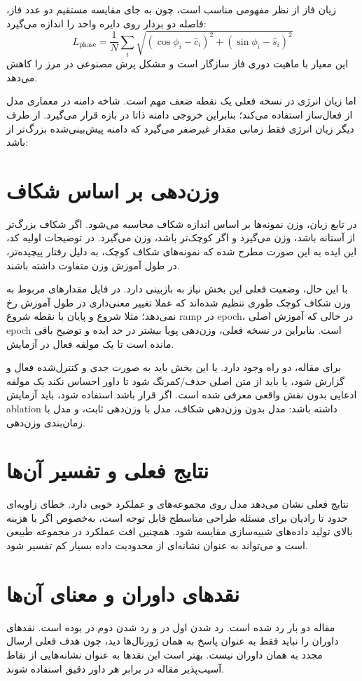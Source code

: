 زیان فاز از نظر مفهومی مناسب است، چون به جای مقایسه مستقیم دو عدد فاز، فاصله دو بردار روی دایره واحد را اندازه می‌گیرد:
\[
L_{\mathrm{phase}}=\frac{1}{N}\sum_i \sqrt{(\cos\phi_i-\hat{c}_i)^2+(\sin\phi_i-\hat{s}_i)^2}
\]
این معیار با ماهیت دوری فاز سازگار است و مشکل پرش مصنوعی در مرز  را کاهش می‌دهد.

اما زیان انرژی در نسخه فعلی یک نقطه ضعف مهم است. شاخه دامنه در معماری مدل از فعال‌ساز  استفاده می‌کند؛ بنابراین خروجی دامنه ذاتا در بازه \lr{$[0,1]$} قرار می‌گیرد. از طرف دیگر زیان انرژی فقط زمانی مقدار غیرصفر می‌گیرد که دامنه پیش‌بینی‌شده بزرگ‌تر از  باشد:


\section{وزن‌دهی بر اساس شکاف}
در تابع زیان، وزن نمونه‌ها بر اساس اندازه شکاف محاسبه می‌شود. اگر شکاف بزرگ‌تر از آستانه باشد، وزن  می‌گیرد و اگر کوچک‌تر باشد، وزن  می‌گیرد. در توضیحات اولیه کد، این ایده به این صورت مطرح شده که نمونه‌های شکاف کوچک، به دلیل رفتار پیچیده‌تر، در طول آموزش وزن متفاوت داشته باشند.

با این حال، وضعیت فعلی این بخش نیاز به بازبینی دارد. در فایل  مقدارهای مربوط به وزن شکاف کوچک طوری تنظیم شده‌اند که عملا تغییر معنی‌داری در طول آموزش رخ نمی‌دهد؛ مثلا شروع  و پایان  با نقطه شروع ramp در  epoch، در حالی که آموزش اصلی  epoch است. بنابراین در نسخه فعلی، وزن‌دهی پویا بیشتر در حد ایده و توضیح باقی مانده است تا یک مولفه فعال در آزمایش.

برای مقاله، دو راه وجود دارد. یا این بخش باید به صورت جدی و کنترل‌شده فعال و گزارش شود، یا باید از متن اصلی حذف/کمرنگ شود تا داور احساس نکند یک مولفه ادعایی بدون نقش واقعی معرفی شده است. اگر قرار باشد استفاده شود، باید آزمایش ablation داشته باشد: مدل بدون وزن‌دهی شکاف، مدل با وزن‌دهی ثابت، و مدل با زمان‌بندی وزن‌دهی.

\section{نتایج فعلی و تفسیر آن‌ها}
نتایج فعلی نشان می‌دهد مدل روی مجموعه‌های  و  عملکرد خوبی دارد. خطای زاویه‌ای حدود  تا  رادیان برای مسئله طراحی متاسطح قابل توجه است، به‌خصوص اگر با هزینه بالای تولید داده‌های شبیه‌سازی مقایسه شود. همچنین افت عملکرد در مجموعه  طبیعی است و می‌تواند به عنوان نشانه‌ای از محدودیت داده بسیار کم تفسیر شود.


\section{نقدهای داوران و معنای آن‌ها}
مقاله دو بار رد شده است. رد شدن اول در  و رد شدن دوم در  بوده است. نقدهای داوران را نباید فقط به عنوان پاسخ به همان ژورنال‌ها دید، چون هدف فعلی ارسال مجدد به همان داوران نیست. بهتر است این نقدها به عنوان نشانه‌هایی از نقاط آسیب‌پذیر مقاله در برابر هر داور دقیق استفاده شوند.


